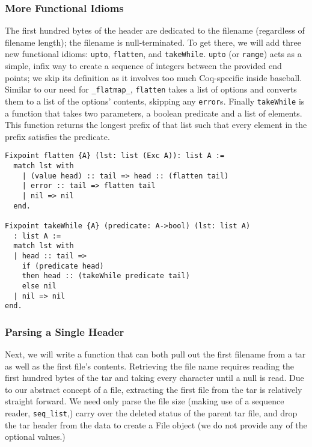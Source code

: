 \documentclass[nocopyrightspace]{sigplanconf}
\begin{document}
\subsubsection{More Functional Idioms}

The first hundred bytes of the header are dedicated to the filename
(regardless of filename length); the filename is null-terminated. To get
there, we will add three new functional idioms: {\tt upto}, {\tt flatten}, and
{\tt takeWhile}. {\tt upto} (or {\tt range}) acts as a simple, infix way to
create a sequence of integers between the provided end points; we skip its
definition as it involves too much Coq-specific inside baseball. Similar to
our need for {\tt \_flatmap\_}, {\tt flatten} takes a list of options and
converts them to a list of the options' contents, skipping any {\tt error}s.
Finally {\tt takeWhile} is a function that takes two parameters, a boolean
predicate and a list of elements. This function returns the longest prefix of
that list such that every element in the prefix satisfies the predicate.

\begin{lstlisting}
Fixpoint flatten {A} (lst: list (Exc A)): list A :=
  match lst with
    | (value head) :: tail => head :: (flatten tail)
    | error :: tail => flatten tail
    | nil => nil
  end.

Fixpoint takeWhile {A} (predicate: A->bool) (lst: list A)
  : list A :=
  match lst with
  | head :: tail => 
    if (predicate head) 
    then head :: (takeWhile predicate tail)
    else nil
  | nil => nil
end.
\end{lstlisting}

\subsubsection{Parsing a Single Header}
Next, we will write a function that can both pull out the first filename from
a tar as well as the first file's contents. Retrieving the file name requires
reading the first hundred bytes of the tar and taking every character until a
null is read. Due to our abstract concept of a file, extracting the first file
from the tar is relatively straight forward. We need only parse the file size
(making use of a sequence reader, {\tt seq\_list},) carry over the deleted
status of the parent tar file, and drop the tar header from the data to create
a File object (we do not provide any of the optional values.)
\end{document}
